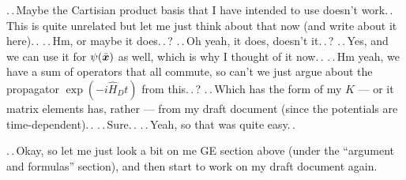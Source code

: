\documentclass{report}
\newcommand{\bsacc}[3]{#1{\boldsymbol{#2}\hspace{#3em}}\hspace{-#3em}}
\newcommand{\barbsx}{{\bsacc{\bar}{x}{.05}}}
\begin{document}
.\,.\,Maybe the Cartisian product basis that I have intended to use doesn't work.\,. This is quite unrelated but let me just think about that now (and write about it here).\,. .\,.\,Hm, or maybe it does.\,.\,? .\,.\,Oh yeah, it does, doesn't it.\,.\,? .\,.\,Yes, and we can use it for $\psi(\barbsx)$ as well, which is why I thought of it now.\,. .\,.\,Hm yeah, we have a sum of operators that all commute, so can't we just argue about the propagator $\exp(-i \hat H_D t)$ from this.\,.\,? .\,.\,Which has the form of my $K$ --- or it matrix elements has, rather --- from my draft document (since the potentials are time-dependent).\,. .\,.\,Sure.\,. .\,.\,Yeah, so that was quite easy.\,. %

.\,.\,Okay, so let me just look a bit on me GE section above (under the ``argument and formulas'' section), and then start to work on my draft document again. %
\end{document}
